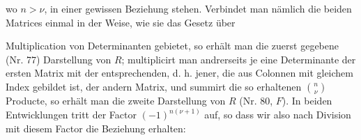 wo $n>\nu$, in einer gewissen Beziehung stehen. Verbindet man nämlich die beiden Matrices einmal in der Weise, wie sie das Gesetz über



Multiplication von Determinanten gebietet, so erhält man die zuerst gegebene (Nr. 77) Darstellung von $R$; multiplicirt man andrerseits je eine Determinante der ersten Matrix mit der entsprechenden, d. h. jener, die aus Colonnen mit gleichem Index gebildet ist, der andern Matrix, und summirt die so erhaltenen $\binom{n}{\nu}$ Producte, so erhält man die zweite Darstellung von $R$ (Nr. 80, $F$). In beiden Entwicklungen tritt der Factor $(-1)^{n(\nu+1)}$ auf, so dass wir also nach Division mit diesem Factor die Beziehung erhalten:


